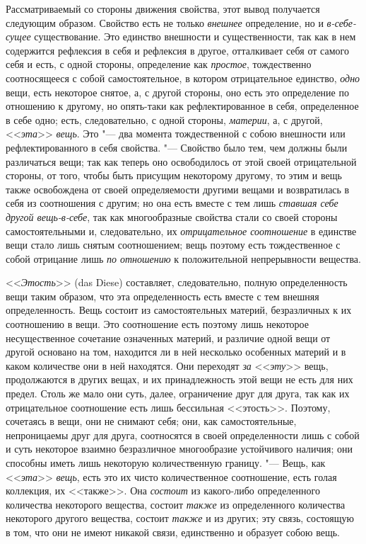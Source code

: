 Рассматриваемый со стороны движения свойства, этот вывод получается
следующим образом. Свойство есть не только {\em внешнее} определение, но и
{\em в-себе-сущее} существование. Это единство
внешности и существенности, так как в нем содержится рефлексия в себя и
рефлексия в другое, отталкивает себя от самого себя и есть, с одной
стороны, определение как {\em простое}, тождественно
соотносящееся с собой самостоятельное, в котором отрицательное единство,
{\em одно} вещи, есть некоторое снятое, а, с другой
стороны, оно есть это определение по отношению к другому, но опять-таки как
рефлектированное в себя, определенное в себе одно; есть, следовательно, с
одной стороны, {\em материи}, а, с другой,
<<{\em эта}>> {\em вещь}. Это "--- два
момента тождественной с собою внешности или рефлектированного в себя
свойства. "--- Свойство было тем, чем должны были различаться вещи; так как
теперь оно освободилось от этой своей отрицательной стороны, от того, чтобы
быть присущим некоторому другому, то этим и вещь также освобождена от своей
определяемости другими вещами и возвратилась в себя из соотношения с
другим; но она есть вместе с тем лишь {\em ставшая себе
другой вещь-в-себе}, так как многообразные свойства стали со своей стороны
самостоятельными и, следовательно, их
{\em отрицательное соотношение} в единстве вещи стало
лишь снятым соотношением; вещь поэтому есть тождественное с собой отрицание
лишь {\em по отношению} к положительной непрерывности вещества.

<<{\em Этость}>> (das Diese) составляет, следовательно,
полную определенность вещи таким образом, что эта определенность есть
вместе с тем внешняя определенность. Вещь состоит из самостоятельных
материй, безразличных к их соотношению в вещи. Это соотношение есть поэтому
лишь некоторое несущественное сочетание означенных материй, и различие
одной вещи от другой основано на том, находится ли в ней несколько
особенных материй и в каком количестве они в ней находятся. Они переходят
{\em за} <<{\em эту}>> вещь,
продолжаются в других вещах, и их принадлежность этой вещи не есть для них
предел. Столь же мало они суть, далее, ограничение друг для друга, так как
их отрицательное соотношение есть лишь бессильная <<этость>>. Поэтому,
сочетаясь в вещи, они не снимают себя; они, как самостоятельные,
непроницаемы друг для друга, соотносятся в своей определенности лишь с
собой и суть некоторое взаимно безразличное многообразие устойчивого
наличия; они способны иметь лишь некоторую количественную границу. "--- Вещь,
как <<{\em эта}>> {\em вещь}, есть
это их чисто количественное соотношение, есть голая коллекция, их <<также>>.
Она {\em состоит} из какого-либо определенного
количества некоторого вещества, состоит {\em также} из
определенного количества некоторого другого вещества, состоит
{\em также} и из других; эту связь, состоящую в том,
что они не имеют никакой связи, единственно и образует собою вещь.


